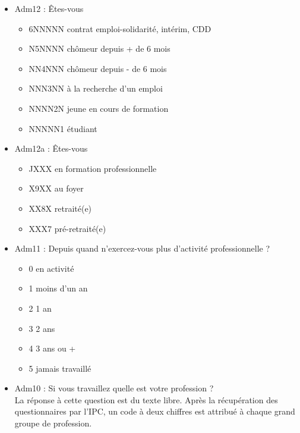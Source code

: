 \documentclass{book}
\begin{document}
\begin{small}
\begin{itemize}[label=\textbullet]
\item Adm12 : Êtes-vous
\begin{itemize}[label=\textbullet]
\item 6NNNNN  contrat emploi-solidarité, intérim, CDD
\item N5NNNN  chômeur depuis + de 6 mois
\item NN4NNN  chômeur depuis - de 6 mois
\item NNN3NN  à la recherche d'un emploi
\item NNNN2N  jeune en cours de formation
\item NNNNN1  étudiant
\end{itemize}

\bigskip

\item Adm12a : Êtes-vous
\begin{itemize}[label=\textbullet, font=\small]
\item JXXX  en formation professionnelle
\item X9XX  au foyer
\item XX8X  retraité(e)
\item XXX7  pré-retraité(e)
\end{itemize}

\bigskip

\item Adm11 : Depuis quand n'exercez-vous plus d'activité professionnelle ?
\begin{itemize}[label=\textbullet, font=\small]
\item 0	en activité
\item 1	moins d'un an
\item 2	1 an
\item 3	2 ans
\item 4	3 ans ou +
\item 5	jamais travaillé
\end{itemize}


\bigskip

\item Adm10 : Si vous travaillez quelle est votre profession ? \\
La réponse à cette question est du texte libre. Après la récupération des questionnaires par l'IPC, un code à deux chiffres est attribué à chaque grand groupe de profession. 
\end{itemize}
\end{small}
\end{document}
